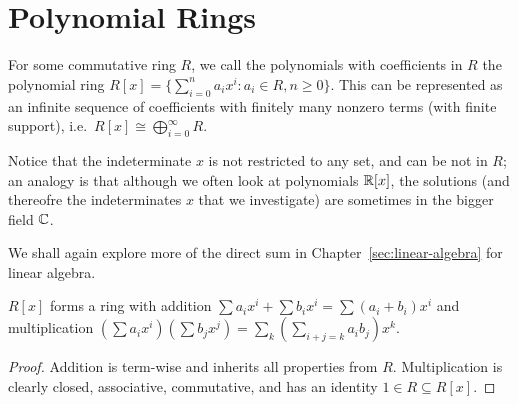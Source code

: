 \section{Polynomial Rings}

\begin{definition}
    For some commutative ring \(R\),
    we call the polynomials with coefficients in \(R\)
    the polynomial ring \(R[x] = \{\sum_{i=0}^n a_i x^i : a_i \in R, n \geq 0\}\).
    This can be represented as an infinite sequence of coefficients
    with finitely many nonzero terms (with finite support),
    i.e.\ \(R[x] \cong \bigoplus_{i=0}^\infty R\).
\end{definition}
\begin{remark}
    Notice that the indeterminate \(x\) is not restricted to any set,
    and can be not in \(R\);
    an analogy is that although we often look at polynomials \(\mathbb{R}[x]\),
    the solutions (and thereofre the indeterminates \(x\) that we investigate)
    are sometimes in the bigger field \(\mathbb{C}\).
\end{remark}
\begin{remark}
    We shall again explore more of the direct sum
    in Chapter~\ref{sec:linear-algebra} for linear algebra.
\end{remark}
\begin{proposition}
    \(R[x]\) forms a ring with addition
    \(\sum a_i x^i + \sum b_i x^i = \sum (a_i+b_i) x^i\)
    and multiplication
    \((\sum a_i x^i)(\sum b_j x^j) = \sum_k (\sum_{i+j=k} a_i b_j) x^k\).
\end{proposition}
\begin{proof}
    Addition is term-wise and inherits all properties from \(R\).
    Multiplication is clearly closed, associative, commutative,
    and has an identity \(1 \in R \subseteq R[x]\).
\end{proof}

